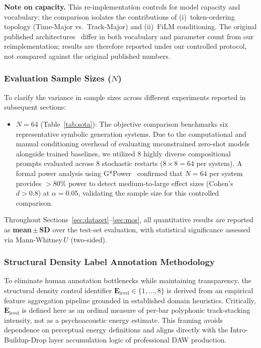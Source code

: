 \documentclass[pdflatex,sn-mathphys-num,twocolumn]{sn-jnl}
\theoremstyle{thmstyleone}
\theoremstyle{thmstyletwo}
\begin{document}
\textbf{Note on capacity.}
This re-implementation controls for model capacity and vocabulary; the comparison isolates the contributions of (i)~token-ordering topology (Time-Major vs.\ Track-Major) and (ii)~FiLM conditioning. The original published architectures~\cite{ens2020mmm,hsiao2021compound} differ in both vocabulary and parameter count from our reimplementation; results are therefore reported under our controlled protocol, not compared against the original published numbers.

\subsubsection*{Evaluation Sample Sizes ($N$)}
To clarify the variance in sample sizes across different experiments reported in subsequent sections:
\begin{itemize}[nosep,leftmargin=*]
  \item \textbf{$N=64$} (Table~\ref{tab:sota}): The objective comparison benchmarks six representative symbolic generation systems. Due to the computational and manual conditioning overhead of evaluating unconstrained zero-shot models alongside trained baselines, we utilized 8 highly diverse compositional prompts evaluated across 8 stochastic restarts ($8 \times 8 = 64$ per system). A formal power analysis using G*Power~\cite{faul2007gpower} confirmed that $N=64$ per system provides $>80\%$ power to detect medium-to-large effect sizes (Cohen's $d>0.8$) at $\alpha=0.05$, validating the sample size for this controlled comparison.
\end{itemize}

Throughout Sections~\ref{sec:dataset}--\ref{sec:mos}, all quantitative results are reported as \textbf{mean\,$\pm$\,SD} over the test-set evaluation, with statistical significance assessed via Mann-Whitney\,$U$ (two-sided).

\subsubsection*{Structural Density Label Annotation Methodology}
\label{sec:energy_annotation}
To eliminate human annotation bottlenecks while maintaining transparency, the structural density control identifier $\mathbf{E}_{\mathrm{level}} \in \{1,\ldots,8\}$ is derived from an empirical feature aggregation pipeline grounded in established domain heuristics. Critically, $\mathbf{E}_{\mathrm{level}}$ is defined here as an ordinal measure of per-bar polyphonic track-stacking intensity, not as a psychoacoustic energy estimate. This framing avoids dependence on perceptual energy definitions and aligns directly with the Intro-Buildup-Drop layer accumulation logic of professional DAW production.
\end{document}
